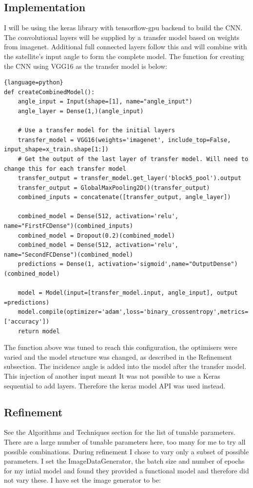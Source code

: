 \documentclass{article}
\begin{document}
\subsection{Implementation}
I will be using the keras library with tensorflow-gpu backend to build the CNN. The convolutional layers will be supplied by a transfer model based on weights from imagenet. Additional full connected layers follow this and will combine with the satellite's input angle to form the complete model. The function for creating the CNN using VGG16 as the transfer model is below:
\begin{lstlisting}{language=python}
def createCombinedModel():
    angle_input = Input(shape=[1], name="angle_input")
    angle_layer = Dense(1,)(angle_input)
    
    # Use a transfer model for the initial layers
    transfer_model = VGG16(weights='imagenet', include_top=False, input_shape=x_train.shape[1:])
    # Get the output of the last layer of transfer model. Will need to change this for each transfer model
    transfer_output = transfer_model.get_layer('block5_pool').output
    transfer_output = GlobalMaxPooling2D()(transfer_output)
    combined_inputs = concatenate([transfer_output, angle_layer])
    
    combined_model = Dense(512, activation='relu', name="FirstFCDense")(combined_inputs)
    combined_model = Dropout(0.2)(combined_model)
    combined_model = Dense(512, activation='relu', name="SecondFCDense")(combined_model)
    predictions = Dense(1, activation='sigmoid',name="OutputDense")(combined_model)
    
    model = Model(input=[transfer_model.input, angle_input], output =predictions)
    model.compile(optimizer='adam',loss='binary_crossentropy',metrics=['accuracy'])
    return model
\end{lstlisting}
The function above was tuned to reach this configuration, the optimisers were varied and the model structure was changed, as described in the Refinement subsection. The incidence angle is added into the model after the transfer model. This injection of another input meant It was not possible to use a Keras sequential to add layers. Therefore the keras model API was used instead. 
\subsection{Refinement}
See the Algorithms and Techniques section for the list of tunable parameters. There are a large number of tunable parameters here, too many for me to try all possible combinations. During refinement I chose to vary only a subset of possible parameters. I set the ImageDataGenerator, the batch size and number of epochs for my intial model and found they provided a functional model and therefore did not vary these.  
I have set the image generator to be:
\end{document}

